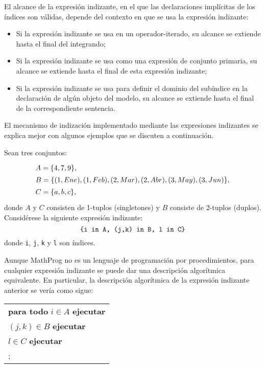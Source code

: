 \documentclass[11pt,spanish]{report}
\begin{document}
El alcance de la expresión indizante, en el que las declaraciones implícitas de los índices son válidas, depende del contexto en que se usa la expresión indizante:

\vspace*{-8pt}

\begin{itemize}
\item Si la expresión indizante se usa en un operador-iterado, su alcance se extiende hasta el final del integrando;
\item Si la expresión indizante se usa como una expresión de conjunto primaria, su alcance se extiende hasta el final de esta expresión indizante;
\item Si la expresión indizante se usa para definir el dominio del subíndice en la declaración de algún objeto del modelo, su alcance se extiende hasta el final de la correspondiente sentencia.
\end{itemize}

\vspace*{-8pt}

El mecanismo de indización implementado mediante las expresiones indizantes se explica mejor con algunos ejemplos que se discuten a continuación.

Sean tres conjuntos:
$$
{\def\arraystretch{1.4}
\begin{array}{l}
A=\{4,7,9\},\\
B=\{(1,Ene),(1,Feb),(2,Mar),(2,Abr),(3,May),(3,Jun)\},\\
C=\{a,b,c\},\\
\end{array}
}
$$
donde $A$ y $C$ consisten de 1-tuplos (singletones) y $B$ consiste de
2-tuplos (duplos). Considérese la siguiente expresión indizante:
$$\mbox{{\tt\{i in A, (j,k) in B, l in C\}}}$$
donde {\tt i}, {\tt j}, {\tt k} y {\tt l} son índices.

Aunque MathProg no es un lenguaje de programación por procedimientos, para cualquier expresión indizante se puede dar una descripción algorítmica equivalente. En particular, la descripción algorítmica de la expresión indizante anterior se vería como sigue:

\noindent\hfil
\begin{tabular}{@{}l@{}}
{\bf para todo} $i\in A$ {\bf ejecutar}\\
\hspace{16pt}{\bf para todo} $(j,k)\in B$ {\bf ejecutar}\\
\hspace{32pt}{\bf para todo} $l\in C$ {\bf ejecutar}\\
\hspace{48pt}{\it acción};\\
\end{tabular}
\end{document}
